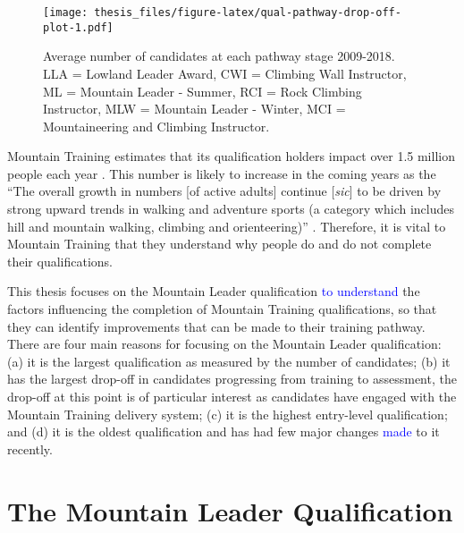 \documentclass[
  12pt,
  a4paper,
]{book}
\begin{document}
\begin{figure}
\centering
\texttt{[image: thesis\_files/figure-latex/qual-pathway-drop-off-plot-1.pdf]}
\caption{\label{fig:qual-pathway-drop-off-plot}Average number of candidates at each pathway stage 2009-2018. LLA = Lowland Leader Award, CWI = Climbing Wall Instructor, ML = Mountain Leader - Summer, RCI = Rock Climbing Instructor, MLW = Mountain Leader - Winter, MCI = Mountaineering and Climbing Instructor.}
\end{figure}

Mountain Training estimates that its qualification holders impact over 1.5 million people each year \citep{MTE2019}. This number is likely to increase in the coming years as the ``The overall growth in numbers {[}of active adults{]} continue {[}\emph{sic}{]} to be driven by strong upward trends in walking and adventure sports (a category which includes hill and mountain walking, climbing and orienteering)'' \citep[p 14]{SportEngland2020}. Therefore, it is vital to Mountain Training that they understand why people do and do not complete their qualifications.

This thesis focuses on the Mountain Leader qualification \textcolor{blue}{to understand} the factors influencing the completion of Mountain Training qualifications, so that they can identify improvements that can be made to their training pathway. There are four main reasons for focusing on the Mountain Leader qualification: (a) it is the largest qualification as measured by the number of candidates; (b) it has the largest drop-off in candidates progressing from training to assessment, the drop-off at this point is of particular interest as candidates have engaged with the Mountain Training delivery system; (c) it is the highest entry-level qualification; and (d) it is the oldest qualification and has had few major changes \textcolor{blue}{made} to it recently.

\hypertarget{the-mountain-leader-qualification}{%
\section{The Mountain Leader Qualification}\label{the-mountain-leader-qualification}}
\end{document}
